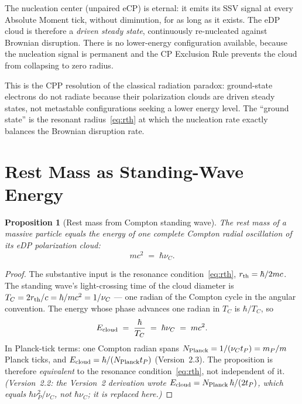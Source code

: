 \documentclass[12pt]{article}
\newtheorem{proposition}[theorem]{Proposition}
\newcommand{\tP}{t_P}
\newcommand{\mP}{m_P}
\newcommand{\nuP}{\nu_P}
\newcommand{\nuC}{\nu_C}
\begin{document}
The nucleation center (unpaired eCP) is eternal: it emits its SSV signal
at every Absolute Moment tick, without diminution, for as long as it exists.
The eDP cloud is therefore a \emph{driven steady state}, continuously
re-nucleated against Brownian disruption.  There is no lower-energy
configuration available, because the nucleation signal is permanent and the
CP Exclusion Rule prevents the cloud from collapsing to zero radius.

This is the CPP resolution of the classical radiation paradox: ground-state
electrons do not radiate because their polarization clouds are driven steady
states, not metastable configurations seeking a lower energy level.  The
``ground state'' is the resonant radius~\eqref{eq:rth} at which the
nucleation rate exactly balances the Brownian disruption rate.

\section{Rest Mass as Standing-Wave Energy}
\label{sec:mass}

\begin{proposition}[Rest mass from Compton standing wave]
\label{prop:mass}
The rest mass of a massive particle equals the energy of one complete
Compton radial oscillation of its eDP polarization cloud:
\begin{equation}
  mc^2 \;=\; \hbar\nuC.
  \label{eq:mc2}
\end{equation}
\end{proposition}

\begin{proof}
The substantive input is the resonance condition~\eqref{eq:rth},
$r_{\rm th} = \hbar/2mc$.  The standing wave's light-crossing time of the
cloud diameter is $T_C = 2r_{\rm th}/c = \hbar/mc^2 = 1/\nuC$ --- one radian of
the Compton cycle in the angular convention.  The energy whose phase advances
one radian in $T_C$ is $\hbar/T_C$, so
\begin{equation}
  E_{\rm cloud} \;=\; \frac{\hbar}{T_C} \;=\; \hbar\nuC \;=\; mc^2 .
  \label{eq:E-cloud}
\end{equation}
In Planck-tick terms: one Compton radian spans
$N_{\rm Planck} = 1/(\nuC\tP) = \mP/m$ Planck ticks,
and $E_{\rm cloud} = \hbar/(N_{\rm Planck}\tP)$ (Version~2.3).
The proposition is therefore \emph{equivalent} to the resonance
condition~\eqref{eq:rth}, not independent of it.
\emph{(Version~2.2: the Version~2 derivation wrote
$E_{\rm cloud} = N_{\rm Planck}\,\hbar/(2\tP)$, which equals
$\hbar\nuP^{2}/\nuC$, not $\hbar\nuC$; it is replaced here.)}
\end{proof}
\end{document}
